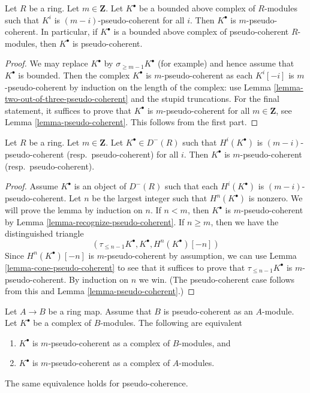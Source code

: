 \begin{lemma}
\label{lemma-complex-pseudo-coherent-modules}
Let $R$ be a ring. Let $m \in \mathbf{Z}$. Let $K^\bullet$ be a bounded
above complex of $R$-modules such that $K^i$ is $(m - i)$-pseudo-coherent
for all $i$. Then $K^\bullet$ is $m$-pseudo-coherent.
In particular, if $K^\bullet$ is a bounded above complex of
pseudo-coherent $R$-modules, then $K^\bullet$ is pseudo-coherent.
\end{lemma}

\begin{proof}
We may replace $K^\bullet$ by $\sigma_{\geq m - 1}K^\bullet$ (for example) and
hence assume that $K^\bullet$ is bounded.
Then the complex $K^\bullet$ is $m$-pseudo-coherent as each
$K^i[-i]$ is $m$-pseudo-coherent by induction on the length of the
complex: use
Lemma \ref{lemma-two-out-of-three-pseudo-coherent}
and the stupid truncations.
For the final statement, it suffices to prove that
$K^\bullet$ is $m$-pseudo-coherent for all $m \in \mathbf{Z}$, see
Lemma \ref{lemma-pseudo-coherent}.
This follows from the first part.
\end{proof}

\begin{lemma}
\label{lemma-cohomology-pseudo-coherent}
Let $R$ be a ring. Let $m \in \mathbf{Z}$.
Let $K^\bullet \in D^{-}(R)$ such that $H^i(K^\bullet)$ is
$(m - i)$-pseudo-coherent (resp.\ pseudo-coherent) for all $i$.
Then $K^\bullet$ is $m$-pseudo-coherent (resp.\ pseudo-coherent).
\end{lemma}

\begin{proof}
Assume $K^\bullet$ is an object of $D^{-}(R)$ such that
each $H^i(K^\bullet)$ is $(m - i)$-pseudo-coherent.
Let $n$ be the largest integer such that $H^n(K^\bullet)$ is nonzero.
We will prove the lemma by induction on $n$.
If $n < m$, then $K^\bullet$ is $m$-pseudo-coherent by
Lemma \ref{lemma-recognize-pseudo-coherent}.
If $n \geq m$, then we have the distinguished triangle
$$
(\tau_{\leq n - 1}K^\bullet, K^\bullet, H^n(K^\bullet)[-n])
$$
Since $H^n(K^\bullet)[-n]$ is $m$-pseudo-coherent by assumption, we
can use
Lemma \ref{lemma-cone-pseudo-coherent}
to see that it suffices to prove that $\tau_{\leq n - 1}K^\bullet$
is $m$-pseudo-coherent. By induction on $n$ we win. (The pseudo-coherent
case follows from this and
Lemma \ref{lemma-pseudo-coherent}.)
\end{proof}

\begin{lemma}
\label{lemma-finite-push-pseudo-coherent}
Let $A \to B$ be a ring map. Assume that $B$ is pseudo-coherent as an
$A$-module. Let $K^\bullet$ be a complex of $B$-modules.
The following are equivalent
\begin{enumerate}
\item $K^\bullet$ is $m$-pseudo-coherent
as a complex of $B$-modules, and
\item $K^\bullet$ is $m$-pseudo-coherent
as a complex of $A$-modules.
\end{enumerate}
The same equivalence holds for pseudo-coherence.
\end{lemma}

